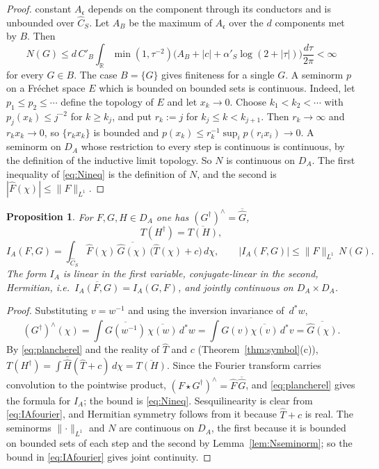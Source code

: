 \documentclass[11pt]{amsart}
\newtheorem{proposition}[theorem]{Proposition}
\theoremstyle{definition}
\theoremstyle{remark}
\newcommand{\R}{\mathbb R}
\newcommand{\dstar}{\,d^{*}}
\newcommand{\Th}{\widehat{T}}
\newcommand{\Ch}{\widehat{C}_S}
\newcommand{\DA}{D_A}
\begin{document}
\begin{proof}
constant $A_{\mathfrak c}$ depends on the component through its conductors and
is unbounded over $\Ch$.  Let $A_B$ be the maximum of $A_{\mathfrak c}$ over
the $d$ components met by $B$.  Then
\[
N(G)\le d\,C'_B\int_{\R}\min(1,\tau^{-2})
\bigl(A_B+|c|+\alpha'_S\log(2+|\tau|)\bigr)\frac{d\tau}{2\pi}<\infty
\]
for every $G\in B$.  The case $B=\{G\}$ gives finiteness for a single $G$.
A seminorm $p$ on a Fr\'echet space $E$ which is bounded on bounded sets is
continuous.  Indeed, let $p_1\le p_2\le\cdots$ define the topology of $E$ and
let $x_k\to0$.  Choose $k_1<k_2<\cdots$ with $p_j(x_k)\le j^{-2}$ for
$k\ge k_j$, and put $r_k:=j$ for $k_j\le k<k_{j+1}$.  Then $r_k\to\infty$ and
$r_kx_k\to0$, so $\{r_kx_k\}$ is bounded and
$p(x_k)\le r_k^{-1}\sup_ip(r_ix_i)\to0$.  A seminorm on $\DA$ whose
restriction to every step is continuous is continuous, by the definition of
the inductive limit topology.  So $N$ is continuous on $\DA$.  The first
inequality of \eqref{eq:Nineq} is the definition of $N$, and the second is
$|\widehat F(\chi)|\le\lVert F\rVert_{L^{1}}$.
\end{proof}

\begin{proposition}\label{prop:bilin}
For $F,G,H\in\DA$ one has $(G^{\dagger})^{\wedge}=\overline{\widehat G}$,
\begin{equation}\label{eq:daggerreal}
T(H^{\dagger})=\overline{T(H)},
\end{equation}
\begin{equation}\label{eq:IAfourier}
I_A(F,G)=\int_{\Ch}\widehat F(\chi)\,\overline{\widehat G(\chi)}\,
\bigl(\Th(\chi)+c\bigr)\,d\chi ,
\qquad |I_A(F,G)|\le\lVert F\rVert_{L^{1}}\,N(G).
\end{equation}
The form $I_A$ is linear in the first variable, conjugate-linear in the
second, Hermitian, i.e.\ $\overline{I_A(F,G)}=I_A(G,F)$, and jointly continuous
on $\DA\times\DA$.
\end{proposition}

\begin{proof}
Substituting $v=w^{-1}$ and using the inversion invariance of $\dstar w$,
\[
(G^{\dagger})^{\wedge}(\chi)=\int\overline{G(w^{-1})}\,\overline{\chi(w)}\dstar w
=\overline{\int G(v)\overline{\chi(v)}\dstar v}=\overline{\widehat G(\chi)} .
\]
By \eqref{eq:plancherel} and the reality of $\Th$ and $c$
(Theorem~\ref{thm:symbol}(c)),
$T(H^{\dagger})=\int\overline{\widehat H}(\Th+c)\,d\chi=\overline{T(H)}$.
Since the Fourier transform carries convolution to the pointwise product,
$(F\star G^{\dagger})^{\wedge}=\widehat F\,\overline{\widehat G}$, and
\eqref{eq:plancherel} gives the formula for $I_A$; the bound is
\eqref{eq:Nineq}.  Sesquilinearity is clear from \eqref{eq:IAfourier}, and
Hermitian symmetry follows from it because $\Th+c$ is real.  The seminorms
$\lVert\cdot\rVert_{L^{1}}$ and $N$ are continuous on $\DA$, the first because
it is bounded on bounded sets of each step and the second by
Lemma~\ref{lem:Nseminorm}; so the bound in \eqref{eq:IAfourier} gives joint
continuity.
\end{proof}
\end{document}
